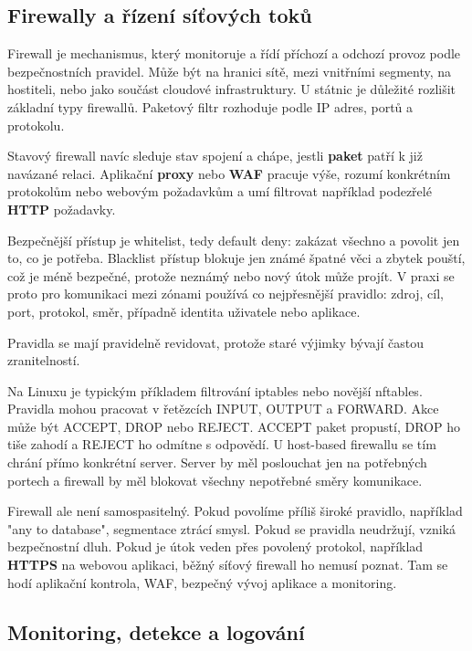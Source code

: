 \documentclass[11pt,a4paper]{article}
\begin{document}
\subsection*{Firewally a řízení síťových toků}

Firewall je mechanismus, který monitoruje a řídí příchozí a odchozí provoz podle bezpečnostních pravidel. Může být na hranici sítě, mezi vnitřními segmenty, na hostiteli, nebo jako součást cloudové infrastruktury. U státnic je důležité rozlišit základní typy firewallů. Paketový filtr rozhoduje podle IP adres, portů a protokolu.

Stavový firewall navíc sleduje stav spojení a chápe, jestli \textbf{paket} patří k již navázané relaci. Aplikační \textbf{proxy} nebo \textbf{WAF} pracuje výše, rozumí konkrétním protokolům nebo webovým požadavkům a umí filtrovat například podezřelé \textbf{HTTP} požadavky.

Bezpečnější přístup je whitelist, tedy default deny: zakázat všechno a povolit jen to, co je potřeba. Blacklist přístup blokuje jen známé špatné věci a zbytek pouští, což je méně bezpečné, protože neznámý nebo nový útok může projít. V praxi se proto pro komunikaci mezi zónami používá co nejpřesnější pravidlo: zdroj, cíl, port, protokol, směr, případně identita uživatele nebo aplikace.

Pravidla se mají pravidelně revidovat, protože staré výjimky bývají častou zranitelností.

Na Linuxu je typickým příkladem filtrování iptables nebo novější nftables. Pravidla mohou pracovat v řetězcích INPUT, OUTPUT a FORWARD. Akce může být ACCEPT, DROP nebo REJECT. ACCEPT paket propustí, DROP ho tiše zahodí a REJECT ho odmítne s odpovědí. U host-based firewallu se tím chrání přímo konkrétní server. Server by měl poslouchat jen na potřebných portech a firewall by měl blokovat všechny nepotřebné směry komunikace.

Firewall ale není samospasitelný. Pokud povolíme příliš široké pravidlo, například "any to database", segmentace ztrácí smysl. Pokud se pravidla neudržují, vzniká bezpečnostní dluh. Pokud je útok veden přes povolený protokol, například \textbf{HTTPS} na webovou aplikaci, běžný síťový firewall ho nemusí poznat. Tam se hodí aplikační kontrola, WAF, bezpečný vývoj aplikace a monitoring.

\subsection*{Monitoring, detekce a logování}
\end{document}
